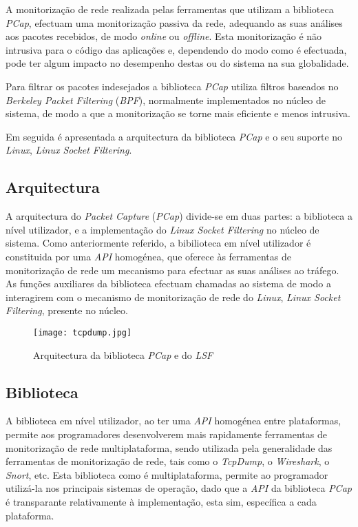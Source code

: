 A monitorização de rede realizada pelas ferramentas que utilizam a biblioteca \textit{PCap}, efectuam uma monitorização passiva da rede, adequando as suas análises aos pacotes recebidos, de modo \textit{online} ou \textit{offline}.
Esta monitorização é não intrusiva para o código das aplicações e, dependendo do modo como é efectuada, pode ter algum impacto no desempenho destas ou do sistema na sua globalidade.

Para filtrar os pacotes indesejados a biblioteca \textit{PCap} utiliza filtros baseados no \textit{Berkeley Packet Filtering} (\textit{BPF}), normalmente implementados no núcleo de sistema, de modo a que a monitorização se torne mais eficiente e menos intrusiva.

Em seguida é apresentada a arquitectura da biblioteca \textit{PCap} e o seu suporte no \textit{Linux}, \textit{Linux Socket Filtering}.

\subsection {Arquitectura}
\label{sect:architecture_libpcap}
A arquitectura do \textit{Packet Capture} (\textit{PCap}) divide-se em duas partes: a biblioteca a nível utilizador, e a implementação do \textit{Linux Socket Filtering} no núcleo de sistema.
Como anteriormente referido, a bibilioteca em nível utilizador é constituida por uma \textit{API} homogénea, que oferece às ferramentas de monitorização de rede um mecanismo para efectuar as suas análises ao tráfego.
As funções auxiliares da biblioteca efectuam chamadas ao sistema de modo a interagirem com o mecanismo de monitorização de rede do \textit{Linux}, \textit{Linux Socket Filtering}, presente no núcleo.

\begin{figure}[htbp]
       \centering
       \texttt{[image: tcpdump.jpg]}
       \caption{Arquitectura da biblioteca \textit{PCap} e do \textit{LSF}}
      \label{fig:pcap_architecture2}
\end{figure}

\subsection{Biblioteca}

A biblioteca em nível utilizador, ao ter uma \textit{API} homogénea entre plataformas, permite aos programadores desenvolverem mais rapidamente ferramentas de monitorização de rede multiplataforma, sendo utilizada pela generalidade das ferramentas de monitorização de rede, tais como o \textit{TcpDump}, o \textit{Wireshark}, o \textit{Snort}, etc.
Esta biblioteca como é multiplataforma, permite ao programador utilizá-la nos principais sistemas de operação, dado que a \textit{API} da biblioteca \textit{PCap} é transparante relativamente à implementação, esta sim, específica a cada plataforma.

